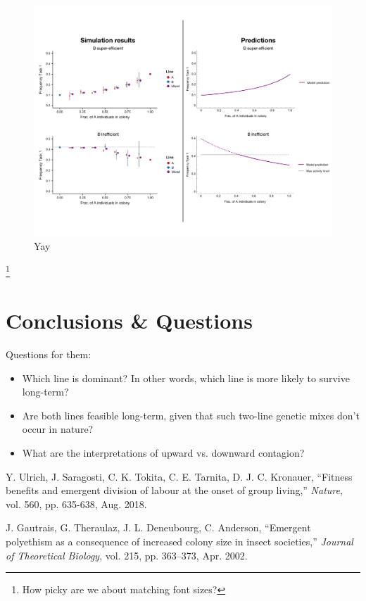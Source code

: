 \documentclass[11pt]{article}
\begin{document}
\begin{figure}[H]
    \centering
    \includegraphics[trim={0 1in 0 1.1in},clip,width=0.95\linewidth]{mixes_comparison.pdf}
    \caption{Yay}
    \label{fig:mixescomp}
\end{figure}
\footnote{How picky are we about matching font sizes?}

\section{Conclusions \& Questions} \label{sec:conclusions}

Questions for them:
\begin{itemize}
    \item Which line is dominant? In other words, which line is more likely to survive long-term?
    \item Are both lines feasible long-term, given that such two-line genetic mixes don’t occur in nature?
    \item What are the interpretations of upward vs. downward contagion? 
\end{itemize}

\begin{thebibliography}{99}

 Y. Ulrich, J. Saragosti, C. K. Tokita, C. E. Tarnita, D. J. C. Kronauer, ``Fitness benefits and emergent division of labour at the onset of group living,'' \textit{Nature}, vol. 560, pp. 635-638, Aug. 2018.

 J. Gautrais, G. Theraulaz, J. L. Deneubourg, C. Anderson, ``Emergent polyethism as a consequence of increased colony size in insect societies,'' \textit{Journal of Theoretical Biology}, vol. 215, pp. 363–373, Apr. 2002.

\end{thebibliography}
\end{document}
